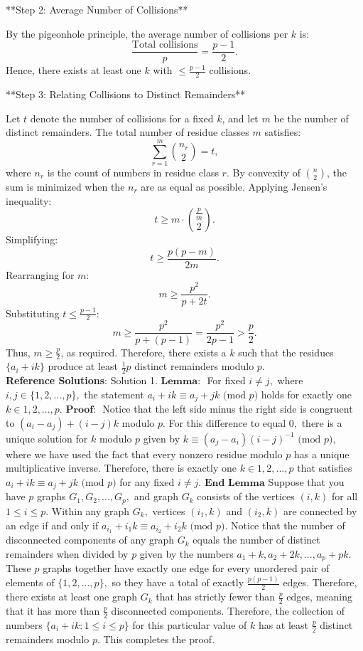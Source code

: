 {**Step 2: Average Number of Collisions**

By the pigeonhole principle, the average number of collisions per \( k \) is:
\[
\frac{\text{Total collisions}}{p} = \frac{p-1}{2}.
\]
Hence, there exists at least one \( k \) with \( \leq \frac{p-1}{2} \) collisions.

**Step 3: Relating Collisions to Distinct Remainders**

Let \( t \) denote the number of collisions for a fixed \( k \), and let \( m \) be the number of distinct remainders. The total number of residue classes \( m \) satisfies:
\[
\sum_{r=1}^m \binom{n_r}{2} = t,
\]
where \( n_r \) is the count of numbers in residue class \( r \). By convexity of \( \binom{n}{2} \), the sum is minimized when the \( n_r \) are as equal as possible. Applying Jensen's inequality:
\[
t \geq m \cdot \binom{\frac{p}{m}}{2}.
\]
Simplifying:
\[
t \geq \frac{p(p - m)}{2m}.
\]
Rearranging for \( m \):
\[
m \geq \frac{p^2}{p + 2t}.
\]
Substituting \( t \leq \frac{p-1}{2} \):
\[
m \geq \frac{p^2}{p + (p - 1)} = \frac{p^2}{2p - 1} > \frac{p}{2}.
\]
Thus, \( m \geq \frac{p}{2} \), as required. Therefore, there exists a \( k \) such that the residues \( \{a_i + ik\} \) produce at least \( \frac{1}{2}p \) distinct remainders modulo \( p \). \\
    \textbf{Reference Solutions}: Solution 1. $\textbf{Lemma: }$ For fixed $i\neq j,$ where $i, j\in\{1, 2, ..., p\},$ the statement $a_i + ik\equiv a_j + jk\text{ (mod } p\text{)}$ holds for exactly one $k\in {1, 2, ..., p}.$
$\textbf{Proof: }$ Notice that the left side minus the right side is congruent to $(a_i - a_j) + (i - j)k$ modulo $p.$ For this difference to equal $0,$ there is a unique solution for $k$ modulo $p$ given by $k\equiv (a_j - a_i)(i - j)^{-1}\text{ (mod } p\text{)},$ where we have used the fact that every nonzero residue modulo $p$ has a unique multiplicative inverse. Therefore, there is exactly one $k\in {1, 2, ..., p}$ that satisfies $a_i + ik\equiv a_j + jk\text{ (mod } p\text{)}$ for any fixed $i\neq j. \textbf{ End Lemma}$
Suppose that you have $p$ graphs $G_1, G_2, ..., G_p,$ and graph $G_k$ consists of the vertices $(i, k)$ for all $1\le i\le p.$ Within any graph $G_k,$ vertices $(i_1, k)$ and $(i_2, k)$ are connected by an edge if and only if $a_{i_1} + i_1k\equiv a_{i_2} + i_2k\text{ (mod } p\text{)}.$ Notice that the number of disconnected components of any graph $G_k$ equals the number of distinct remainders when divided by $p$ given by the numbers $a_1 + k, a_2 + 2k, ..., a_p + pk.$
These $p$ graphs together have exactly one edge for every unordered pair of elements of $\{1, 2, ..., p\},$ so they have a total of exactly $\frac{p(p-1)}{2}$ edges. Therefore, there exists at least one graph $G_k$ that has strictly fewer than $\frac{p}{2}$ edges, meaning that it has more than $\frac{p}{2}$ disconnected components. Therefore, the collection of numbers $\{a_i + ik: 1\le i\le p\}$ for this particular value of $k$ has at least $\frac{p}{2}$ distinct remainders modulo $p.$ This completes the proof. \\
}
